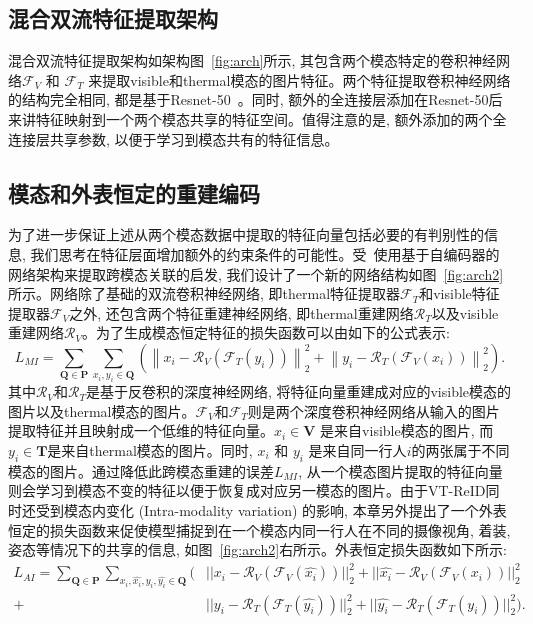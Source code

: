 \subsection{混合双流特征提取架构}
混合双流特征提取架构如架构图~\ref{fig:arch}所示, 其包含两个模态特定的卷积神经网络$\mathcal{F}_V$ 和 $\mathcal{F}_T$ 来提取visible和thermal模态的图片特征。两个特征提取卷积神经网络的结构完全相同, 都是基于Resnet-50~\cite{he2016deep}。同时, 额外的全连接层添加在Resnet-50后来讲特征映射到一个两个模态共享的特征空间。值得注意的是, 额外添加的两个全连接层共享参数, 以便于学习到模态共有的特征信息。
\subsection{模态和外表恒定的重建编码}
为了进一步保证上述从两个模态数据中提取的特征向量包括必要的有判别性的信息, 我们思考在特征层面增加额外的约束条件的可能性。受~\cite{cao2016correlation}使用基于自编码器的网络架构来提取跨模态关联的启发, 我们设计了一个新的网络结构如图~\ref{fig:arch2}所示。网络除了基础的双流卷积神经网络, 即thermal特征提取器$\mathcal{F}_T$和visible特征提取器$\mathcal{F}_V$之外, 还包含两个特征重建神经网络, 即thermal重建网络$\mathcal{R}_T$以及visible重建网络$\mathcal{R}_V$。为了生成模态恒定特征的损失函数可以由如下的公式表示: 
\begin{equation}
  L_{M I}=\sum_{\mathbf{Q} \in \mathbf{P}} \sum_{x_i, y_i \in \mathbf{Q}}\left(\left\|x_i-\mathcal{R}_V\left(\mathcal{F}_T\left(y_i\right)\right)\right\|_2^2+\left\|y_i-\mathcal{R}_T\left(\mathcal{F}_V\left(x_i\right)\right)\right\|_2^2\right).
  \label{eq:MI_loss}
\end{equation} 
其中$\mathcal{R}_V$和$\mathcal{R}_T$是基于反卷积的深度神经网络, 将特征向量重建成对应的visible模态的图片以及thermal模态的图片。$\mathcal{F}_V$和$\mathcal{F}_T$则是两个深度卷积神经网络从输入的图片提取特征并且映射成一个低维的特征向量。$x_i \in \mathbf{V}$ 是来自visible模态的图片, 而$y_i \in \mathbf{T}$是来自thermal模态的图片。同时, $x_i$ 和 $y_i$ 是来自同一行人$i$的两张属于不同模态的图片。通过降低此跨模态重建的误差$L_{M I}$, 从一个模态图片提取的特征向量则会学习到模态不变的特征以便于恢复成对应另一模态的图片。由于VT-ReID同时还受到模态内变化 (Intra-modality variation) 的影响, 本章另外提出了一个外表恒定的损失函数来促使模型捕捉到在一个模态内同一行人在不同的摄像视角, 着装, 姿态等情况下的共享的信息, 如图~\ref{fig:arch2}右所示。外表恒定损失函数如下所示:
\begin{equation}
  \begin{aligned}
  L_{AI} = \sum_{\mathbf{Q} \in \mathbf{P}}\sum_{x_i,\hat{x_i},y_i,\hat{y_i} \in \mathbf{Q}}(&||x_i - \mathcal{R}_V(\mathcal{F}_V(\hat{x_i}))||_2^2+
      ||\hat{x_i} - \mathcal{R}_V(\mathcal{F}_V(x_i))||_2^2  \\
      +&||y_i - \mathcal{R}_T(\mathcal{F}_T(\hat{y_i}))||_2^2+ 
      ||\hat{y_i} -\mathcal{R}_T(\mathcal{F}_T(y_i))||_2^2).
  \end{aligned}
  \label{eq:AI_loss}
  \end{equation}
